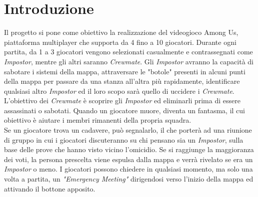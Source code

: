 \section*{Introduzione}

Il progetto si pone come obiettivo la realizzazione del videogioco Among Us, piattaforma multiplayer che supporta da 4 fino a 10 giocatori. Durante ogni partita, da 1 a 3 giocatori vengono selezionati casualmente e contrassegnati come \textit{Impostor}, mentre gli altri saranno \textit{Crewmate}. Gli \textit{Impostor} avranno la capacit\`a di sabotare i sistemi della mappa, attraversare le "botole" presenti in alcuni punti della mappa per passare da una stanza all'altra pi\`u rapidamente, identificare qualsiasi altro \textit{Impostor} ed il loro scopo sarà quello di uccidere i \textit{Crewmate}.\\
L'obiettivo dei \textit{Crewmate} \`e scoprire gli \textit{Impostor} ed eliminarli prima di essere assassinati o sabotati. Quando un giocatore muore, diventa un fantasma, il cui obiettivo è aiutare i membri rimanenti della propria squadra.\\
Se un giocatore trova un cadavere, pu\`o segnalarlo, il che porter\`a ad una riunione di gruppo in cui i giocatori discuteranno su chi pensano sia un \textit{Impostor}, sulla base delle prove che hanno visto vicino l'omicidio. Se si raggiunge la maggioranza dei voti, la persona prescelta viene espulsa dalla mappa e verr\`a rivelato se era un \textit{Impostor} o meno. I giocatori possono chiedere in qualsiasi momento, ma solo una volta a partita, un \textit{"Emergency Meeting"} dirigendosi verso l'inizio della mappa ed attivando il bottone apposito.